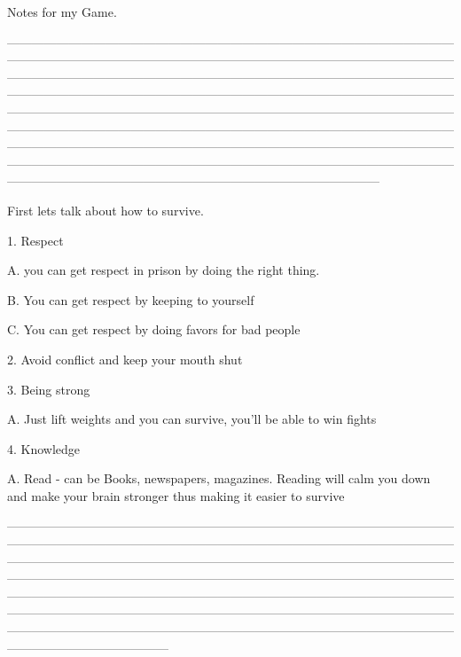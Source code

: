 


Notes for my Game.

------------------------------------------------------------------------------------------------------------------------------------------------------------------------------------------------------------------------------------------------------------------------------------------------------------------------------------------------------------------------------------------------------------------------------------------------------------------------------------------------------------------------------------------------------------------------------------------------------------------------------------------------------------------------------------------------------------------------------------------------------------------------------------------------------------------------------------------------------------------------------------------------------------------------------------------------------------------------------------------


First lets talk about how to survive.

	1. Respect
	
		A.  you can get respect in prison by doing the right thing.  
	
		B. You can get respect by keeping to yourself
	
		C. You can get respect by doing favors for bad people
	
	
	
	2. Avoid conflict and keep your mouth shut
	
	
	3. Being strong
		
		A. Just lift weights and you can survive, you'll be able to win fights
		
		
	4. Knowledge
		
		A. Read - can be Books, newspapers, magazines.  Reading will calm you down and make your brain stronger thus making it easier to survive

		
---------------------------------------------------------------------------------------------------------------------------------------------------------------------------------------------------------------------------------------------------------------------------------------------------------------------------------------------------------------------------------------------------------------------------------------------------------------------------------------------------------------------------------------------------------------------------------------------------------------------------------------------------------------------------------------------------------------------------------------------------------------------------------------------------------------------------
			
